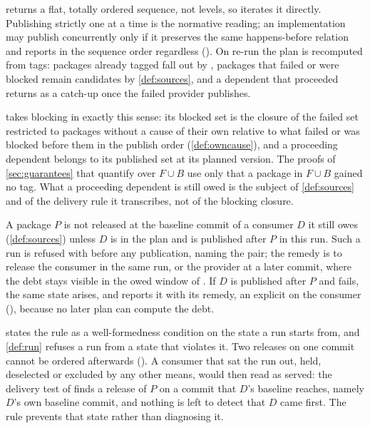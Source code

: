  returns a flat, totally ordered sequence, not levels, so
 iterates it directly. Publishing strictly one at a time is the
normative reading; an implementation may publish concurrently only if it
preserves the same happens-before relation and reports in the sequence order
regardless (). On re-run the plan is recomputed from tags: packages
already tagged fall out by , packages that failed or were blocked
remain candidates by \cref{def:sources}, and a dependent that proceeded
returns as a catch-up once the failed provider publishes.

\begin{remark}
\label{rem:run-blocked}
 takes blocking in exactly this sense: its blocked set is the
closure of the failed set restricted to packages without a cause of their own
relative to what failed or was blocked before them in the publish order
(\cref{def:owncause}), and a proceeding dependent belongs to its published
set at its planned version. The proofs of \cref{sec:guarantees} that quantify
over $F \cup B$ use only that a package in $F \cup B$ gained no tag. What a
proceeding dependent is still owed is the subject of \cref{def:sources} and
of the delivery rule it transcribes, not of the blocking closure.
\end{remark}

\begin{definition}
\label{def:owed-commit}
A package $P$ is not released at the baseline commit of a consumer $D$ it
still owes (\cref{def:sources}) unless $D$ is in the plan and is published
after $P$ in this run. Such a run is refused with  before any
publication, naming the pair; the remedy is to release the consumer in the same
run, or the provider at a later commit, where the debt stays visible in the
owed window of . If $D$ is published after $P$ and fails, the same
state arises, and  reports it with its remedy, an explicit
 on the consumer (), because no later
plan can compute the debt.
\end{definition}

 states the rule as a well-formedness condition on the state a
run starts from, and \cref{def:run} refuses a run from a state that violates
it. Two releases on one commit cannot be ordered afterwards (). A
consumer that sat the run out, held, deselected or excluded by any other
means, would then read as served: the delivery test of  finds a
release of $P$ on a commit that $D$'s baseline reaches, namely $D$'s own
baseline commit, and nothing is left to detect that $D$ came first. The rule
prevents that state rather than diagnosing it.

